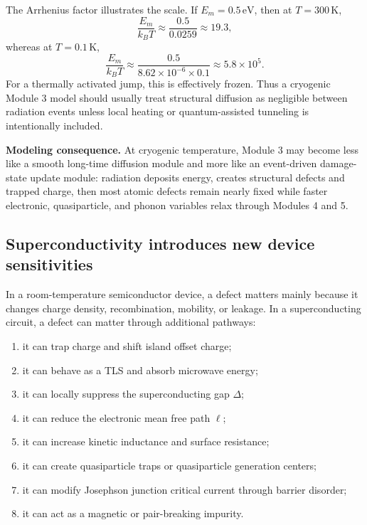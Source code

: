 \documentclass[11pt]{article}
\begin{document}
The Arrhenius factor illustrates the scale. If $E_m=0.5\,\mathrm{eV}$, then at $T=300\,\mathrm{K}$,
\begin{equation}
\frac{E_m}{k_B T}\approx \frac{0.5}{0.0259}\approx 19.3,
\end{equation}
whereas at $T=0.1\,\mathrm{K}$,
\begin{equation}
\frac{E_m}{k_B T}\approx \frac{0.5}{8.62\times 10^{-6}\times 0.1}\approx 5.8\times 10^{5}.
\end{equation}
For a thermally activated jump, this is effectively frozen. Thus a cryogenic Module 3 model should usually treat structural diffusion as negligible between radiation events unless local heating or quantum-assisted tunneling is intentionally included.

\begin{notebox}
\textbf{Modeling consequence.} At cryogenic temperature, Module 3 may become less like a smooth long-time diffusion module and more like an event-driven damage-state update module: radiation deposits energy, creates structural defects and trapped charge, then most atomic defects remain nearly fixed while faster electronic, quasiparticle, and phonon variables relax through Modules 4 and 5.
\end{notebox}

\subsection{Superconductivity introduces new device sensitivities}

In a room-temperature semiconductor device, a defect matters mainly because it changes charge density, recombination, mobility, or leakage. In a superconducting circuit, a defect can matter through additional pathways:
\begin{enumerate}[label=\arabic*.]
\item it can trap charge and shift island offset charge;
\item it can behave as a TLS and absorb microwave energy;
\item it can locally suppress the superconducting gap $\Delta$;
\item it can reduce the electronic mean free path $\ell$;
\item it can increase kinetic inductance and surface resistance;
\item it can create quasiparticle traps or quasiparticle generation centers;
\item it can modify Josephson junction critical current through barrier disorder;
\item it can act as a magnetic or pair-breaking impurity.
\end{enumerate}
\end{document}
